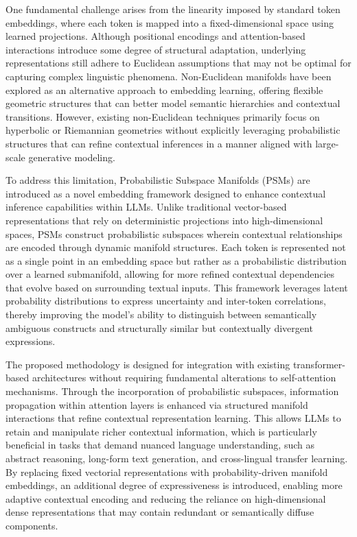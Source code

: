 \documentclass{article}
\begin{document}
One fundamental challenge arises from the linearity imposed by standard token embeddings, where each token is mapped into a fixed-dimensional space using learned projections. Although positional encodings and attention-based interactions introduce some degree of structural adaptation, underlying representations still adhere to Euclidean assumptions that may not be optimal for capturing complex linguistic phenomena. Non-Euclidean manifolds have been explored as an alternative approach to embedding learning, offering flexible geometric structures that can better model semantic hierarchies and contextual transitions. However, existing non-Euclidean techniques primarily focus on hyperbolic or Riemannian geometries without explicitly leveraging probabilistic structures that can refine contextual inferences in a manner aligned with large-scale generative modeling.

To address this limitation, Probabilistic Subspace Manifolds (PSMs) are introduced as a novel embedding framework designed to enhance contextual inference capabilities within LLMs. Unlike traditional vector-based representations that rely on deterministic projections into high-dimensional spaces, PSMs construct probabilistic subspaces wherein contextual relationships are encoded through dynamic manifold structures. Each token is represented not as a single point in an embedding space but rather as a probabilistic distribution over a learned submanifold, allowing for more refined contextual dependencies that evolve based on surrounding textual inputs. This framework leverages latent probability distributions to express uncertainty and inter-token correlations, thereby improving the model’s ability to distinguish between semantically ambiguous constructs and structurally similar but contextually divergent expressions.

The proposed methodology is designed for integration with existing transformer-based architectures without requiring fundamental alterations to self-attention mechanisms. Through the incorporation of probabilistic subspaces, information propagation within attention layers is enhanced via structured manifold interactions that refine contextual representation learning. This allows LLMs to retain and manipulate richer contextual information, which is particularly beneficial in tasks that demand nuanced language understanding, such as abstract reasoning, long-form text generation, and cross-lingual transfer learning. By replacing fixed vectorial representations with probability-driven manifold embeddings, an additional degree of expressiveness is introduced, enabling more adaptive contextual encoding and reducing the reliance on high-dimensional dense representations that may contain redundant or semantically diffuse components.
\end{document}
